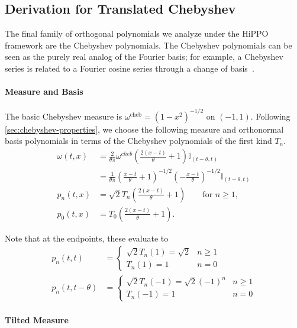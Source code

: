 \documentclass[../../hippo]{subfiles}
\begin{document}
\subsection{Derivation for Translated Chebyshev}
\label{sec:derivation-chebyshev}

The final family of orthogonal polynomials we analyze under the HiPPO framework are the Chebyshev polynomials.
The Chebyshev polynomials can be seen as the purely real analog of the Fourier basis;
for example, a Chebyshev series is related to a Fourier cosine series through a change of basis~\citep{boyd2001chebyshev}.


\paragraph{Measure and Basis}


The basic Chebyshev measure is $\omega^{\mathrm{cheb}} = (1-x^2)^{-1/2}$ on $(-1, 1)$.
Following \cref{sec:chebyshev-properties}, we choose the following measure and orthonormal basis polynomials in terms of the Chebyshev polynomials of the first kind $T_n$.
\begin{align*}%
  \omega(t, x) &= \frac{2}{\theta\pi} \omega^{cheb}\left( \frac{2(x-t)}{\theta} + 1 \right) \mathbb{I}_{(t-\theta, t)}
  \\
  &= \frac{1}{\theta\pi} \left( \frac{x-t}{\theta} + 1 \right)^{-1/2} \left( -\frac{x-t}{\theta} \right)^{-1/2} \mathbb{I}_{(t-\theta, t)}
  \\
  p_n(t, x) &= \sqrt{2} T_n\left( \frac{2(x-t)}{\theta} + 1 \right) \qquad \text{for } n \geq 1,
  \\
  p_0(t, x) &= T_0\left( \frac{2(x-t)}{\theta} + 1 \right).
\end{align*}

Note that at the endpoints, these evaluate to
\begin{align*}%
  p_n(t, t) &=
  \begin{cases}
    \sqrt{2} T_n(1) = \sqrt{2} & n \ge 1
    \\
    T_n(1) = 1 & n = 0
  \end{cases}
  \\
  p_n(t, t-\theta) &=
  \begin{cases}%
    \sqrt{2} T_n(-1) = \sqrt{2} (-1)^{n} & n \ge 1
    \\
    T_n(-1) = 1 & n = 0
  \end{cases}
\end{align*}

\paragraph{Tilted Measure}
\end{document}
